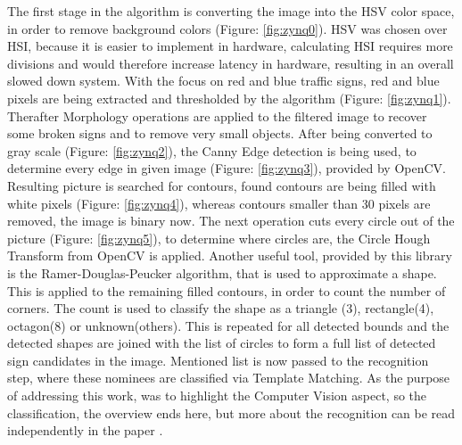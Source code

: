 The first stage in the algorithm is
converting the image into the HSV color space, in order to remove background colors (Figure: \ref{fig:zynq0}). HSV was chosen over HSI, because it is easier to implement in hardware, calculating  HSI requires more divisions and would therefore increase latency in hardware, resulting in an overall slowed down system. With the focus on red and blue traffic signs, red and blue pixels are being extracted and thresholded by the algorithm (Figure: \ref{fig:zynq1}). Therafter Morphology  operations  are  applied  to  the  filtered image to recover some broken signs and to remove very small objects. After being converted to gray scale (Figure: \ref{fig:zynq2}), the Canny Edge detection is being used, to determine every edge in given image (Figure: \ref{fig:zynq3}), provided by OpenCV. Resulting picture is searched for contours, found contours are being filled with white pixels (Figure: \ref{fig:zynq4}), whereas contours smaller than 30 pixels are removed, the image is binary now. The next operation cuts every circle out of the picture (Figure: \ref{fig:zynq5}), to determine where circles are, the Circle Hough Transform from OpenCV is applied.
Another useful tool, provided by this library is the  Ramer-Douglas-Peucker 
algorithm, that is used to approximate a shape.
This is applied to the remaining filled contours, in order to count the number of corners. The count is used
to classify the shape as a triangle (3), rectangle(4), octagon(8) or unknown(others). This is repeated for all detected bounds and the detected shapes are joined with the list of circles to form a full list of detected sign candidates in the image. Mentioned list is now passed to the recognition step, where these nominees are classified via Template Matching. \newline
As the purpose of addressing this work, was to highlight the Computer Vision aspect, so the classification, the overview ends here, but more about the recognition can be read independently in the paper \cite{zynq}. 
